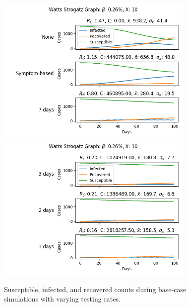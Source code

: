 \documentclass[fullpage]{extarticle}
\begin{document}
\begin{large}
\begin{flushleft}
\begin{figure}
\begin{center}
	\label{fig3}
	\includegraphics[width=0.85\textwidth]{figures/ws/results_base_none-symp-7}
	\includegraphics[width=0.85\textwidth]{figures/ws/results_base_3-2-1}
	\caption{Susceptible, infected, and recovered counts during base-case simulations with varying testing rates.}
\end{center}
\end{figure}



\end{flushleft}
\end{large}
\end{document}
